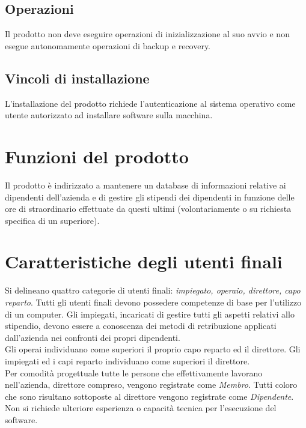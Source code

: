 \documentclass{scrreprt}
\begin{document}
	\subsection{Operazioni}
	Il prodotto non deve eseguire operazioni di inizializzazione al suo avvio e non esegue autonomamente operazioni di backup e recovery.

	\subsection{Vincoli di installazione}
	L'installazione del prodotto richiede l'autenticazione al sistema operativo come utente autorizzato ad installare software sulla macchina.


\section{Funzioni del prodotto}
Il prodotto è indirizzato a mantenere un database di informazioni relative ai dipendenti dell'azienda e di gestire gli stipendi dei dipendenti in funzione delle ore di straordinario effettuate da questi ultimi (volontariamente o su richiesta specifica di un superiore).


\section{Caratteristiche degli utenti finali}
Si delineano quattro categorie di utenti finali: \textit{impiegato, operaio, direttore, capo reparto}. Tutti gli utenti finali devono possedere competenze di base per l'utilizzo di un computer. Gli impiegati, incaricati di gestire tutti gli aspetti relativi allo stipendio, devono essere a conoscenza dei metodi di retribuzione applicati dall'azienda nei confronti dei propri dipendenti.\\
Gli operai individuano come superiori il proprio capo reparto ed il direttore. Gli impiegati ed i capi reparto individuano come superiori il direttore.\\
Per comodità progettuale tutte le persone che effettivamente lavorano nell'azienda, direttore compreso, vengono registrate come \textit{Membro}. Tutti coloro che sono risultano sottoposte al direttore vengono registrate come \textit{Dipendente}.\\
Non si richiede ulteriore esperienza o capacità tecnica per l'esecuzione del software.
\end{document}
